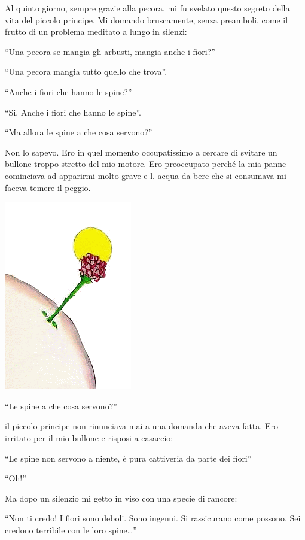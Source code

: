 \documentclass[11pt]{scrbook}
\begin{document}
Al quinto giorno, sempre grazie alla pecora, mi fu svelato questo
segreto della vita del piccolo principe. Mi domando bruscamente, senza
preamboli, come il frutto di un problema meditato a lungo in silenzi:

``Una pecora se mangia gli arbusti, mangia anche i fiori?''

``Una pecora mangia tutto quello che trova''.

``Anche i fiori che hanno le spine?''

``Si. Anche i fiori che hanno le spine''.

``Ma allora le spine a che cosa servono?''

Non lo sapevo. Ero in quel momento occupatissimo a cercare di svitare un
bullone troppo stretto del mio motore. Ero preoccupato perché la mia
panne cominciava ad apparirmi molto grave e l. acqua da bere che si
consumava mi faceva temere il peggio.

\begin{center}
\includegraphics{./img/7a.png}

\end{center}

``Le spine a che cosa servono?''

il piccolo principe non rinunciava mai a una domanda che aveva fatta.
Ero irritato per il mio bullone e risposi a casaccio:

``Le spine non servono a niente, è pura cattiveria da parte dei fiori''

``Oh!''

Ma dopo un silenzio mi getto in viso con una specie di rancore:

``Non ti credo! I fiori sono deboli. Sono ingenui. Si rassicurano come
possono. Sei credono terribile con le loro spine\ldots{}''
\end{document}
